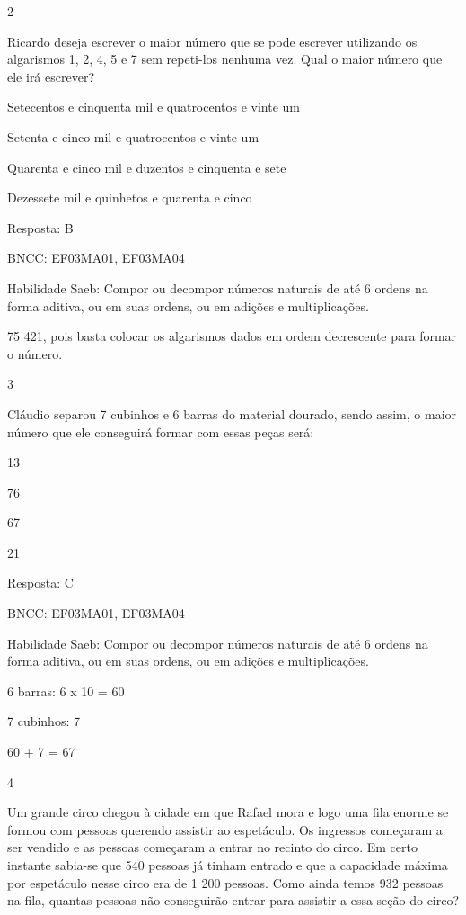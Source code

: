\begin{escolha}
{\begin{escolha}
{\num{2}

Ricardo deseja escrever o maior número que se pode escrever utilizando
os algarismos 1, 2, 4, 5 e 7 sem repeti-los nenhuma vez. Qual o maior
número que ele irá escrever?

\begin{escolha}
\item
  Setecentos e cinquenta mil e quatrocentos e vinte um
\item
  Setenta e cinco mil e quatrocentos e vinte um
\item
  Quarenta e cinco mil e duzentos e cinquenta e sete
\item
  Dezessete mil e quinhetos e quarenta e cinco
\end{escolha}

Resposta: B

BNCC: EF03MA01, EF03MA04

Habilidade Saeb: Compor ou decompor números naturais de até 6 ordens na
forma aditiva, ou em suas ordens, ou em adições e multiplicações.

75 421, pois basta colocar os algarismos dados em ordem decrescente para
formar o número.

\num{3}

Cláudio separou 7 cubinhos e 6 barras do material dourado, sendo assim,
o maior número que ele conseguirá formar com essas peças será:

\begin{escolha}
\item
  13
\item
  76
\item
  67
\item
  21
\end{escolha}

Resposta: C

BNCC: EF03MA01, EF03MA04

Habilidade Saeb: Compor ou decompor números naturais de até 6 ordens na
forma aditiva, ou em suas ordens, ou em adições e multiplicações.

6 barras: 6 x 10 = 60

7 cubinhos: 7

60 + 7 = 67

\num{4}

Um grande circo chegou à cidade em que Rafael mora e logo uma fila
enorme se formou com pessoas querendo assistir ao espetáculo. Os
ingressos começaram a ser vendido e as pessoas começaram a entrar no
recinto do circo. Em certo instante sabia-se que 540 pessoas já tinham
entrado e que a capacidade máxima por espetáculo nesse circo era de 1
200 pessoas. Como ainda temos 932 pessoas na fila, quantas pessoas não
conseguirão entrar para assistir a essa seção do circo?

}
\end{escolha}}
\end{escolha}
